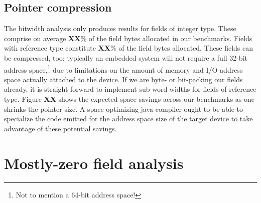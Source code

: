 \documentclass[preprint]{acmconf}
\begin{document}
\subsection{Pointer compression}\label{sec:ptrcmp}
The bitwidth analysis only produces results for fields of integer type.
These comprise on average {\bf XX}\% of the field bytes allocated in
our benchmarks.  Fields with reference type constitute {\bf XX}\% of
the field bytes allocated.  These fields can be compressed, too:
typically an embedded system will not require a full 32-bit address
space,\footnote{Not to mention a 64-bit address space!} due to
limitations on the amount of memory and I/O address space actually attached
to the device.  If we are byte- or bit-packing our fields already,
it is straight-forward to implement sub-word widths for fields of
reference type.  Figure {\bf XX} shows the expected space savings
across our benchmarks as one shrinks the pointer size.  A
space-optimizing java compiler ought to be able to specialize the code
emitted for the address space size of the target device to take
advantage of these potential savings.

\section{Mostly-zero field analysis}
\end{document}
